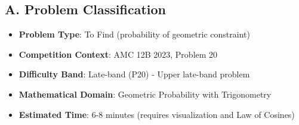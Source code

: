\documentclass[12pt]{article}
\begin{document}
\begin{problemconfigbox}
\subsection*{A. Problem Classification}
\begin{itemize}[leftmargin=*]
    \item \textbf{Problem Type}: To Find (probability of geometric constraint)
    \item \textbf{Competition Context}: AMC 12B 2023, Problem 20
    \item \textbf{Difficulty Band}: Late-band (P20) - Upper late-band problem
    \item \textbf{Mathematical Domain}: Geometric Probability with Trigonometry
    \item \textbf{Estimated Time}: 6-8 minutes (requires visualization and Law of Cosines)
\end{itemize}


\end{problemconfigbox}
\end{document}
